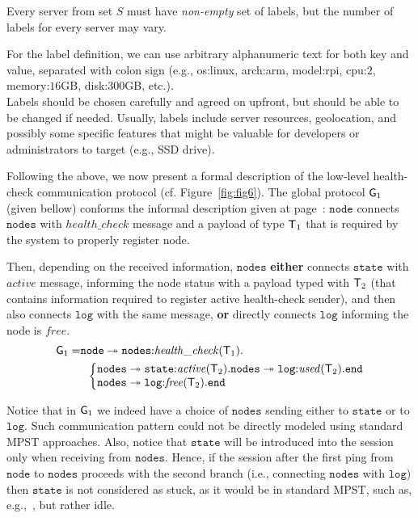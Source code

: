 \begin{definition}
Every server from set $S$ must have \emph{non-empty} set of labels, but the number of labels for every server may vary.
\end{definition}

\noindent
For the label definition, we can use arbitrary alphanumeric text for both key and value, separated with colon sign (e.g.,  os:linux, arch:arm, model:rpi, cpu:$2$, memory:$16$GB, disk:$300$GB, etc.).\\

Labels should be chosen carefully and agreed on upfront, but should be able to be changed if needed. Usually, labels include server resources, geolocation, and possibly some specific features that might be valuable for developers or administrators to target (e.g., SSD drive).

Following the above, we now present a formal description of the low-level health-check communication protocol (cf. Figure~\ref{fig:fig6}). 
The global protocol ${\sf G}_1$ (given bellow) conforms the informal description given at 
page~\pageref{informal_description_health-check}: $\mathtt{node}$ connects $\mathtt{nodes}$ with $\mathit{health{\_}check}$ message and a payload of type ${\mathsf T}_1$ that is required by the system to properly register node. 

Then, depending on the received information, $\mathtt{nodes}$ {\bf either} connects $\mathtt{state}$ with $\mathit{active}$ 
message, informing the node status with a payload typed with ${\mathsf T}_2$ (that contains information required to register active health-check sender),
and then also connects $\mathtt{log}$ with the same message, 
{\bf or} directly connects $\mathtt{log}$ informing the node is $\mathit{free}$.
\begin{align*}
\G_1 = & 
\mathtt{node} \twoheadrightarrow \mathtt{nodes}{:}\mathit{health{\_}check}(\T_1).\\
& \hspace{2mm}
\left\{
\begin{array}{@{}l@{}}
\mathtt{nodes} \twoheadrightarrow \mathtt{state}{:}\mathit{active}(\T_2).\mathtt{nodes}\twoheadrightarrow \mathtt{log}{:}\mathit{used}(\T_2).\tend\\
\mathtt{nodes}\twoheadrightarrow \mathtt{log}{:}\mathit{free}(\T_2).\tend
\end{array} \right.
\end{align*}

Notice that in ${\sf G}_1$ we indeed have a choice of $\mathtt{nodes}$ sending either to $\mathtt{state}$ or to $\mathtt{log}$. Such communication pattern could not be directly modeled using standard MPST approaches. 
Also, notice that $\mathtt{state}$ will be introduced into the session only when receiving from $\mathtt{nodes}$. 
Hence, if the session after the first ping from $\mathtt{node}$ to $\mathtt{nodes}$ proceeds with the second branch (i.e., connecting $\mathtt{nodes}$ with $\mathtt{log}$) then $\mathtt{state}$ is not considered as stuck, as it would be in standard MPST, such as, e.g.,~\cite{HondaYC08}, but rather idle. 

